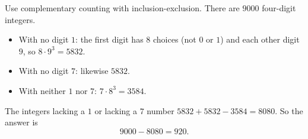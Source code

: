 Use complementary counting with inclusion-exclusion. There are $9000$ four-digit integers.
\begin{itemize}
\item With no digit $1$: the first digit has $8$ choices (not $0$ or $1$) and each other digit $9$, so $8\cdot9^3=5832$.
\item With no digit $7$: likewise $5832$.
\item With neither $1$ nor $7$: $7\cdot8^3=3584$.
\end{itemize}
The integers lacking a $1$ or lacking a $7$ number $5832+5832-3584=8080$. So the answer is
\[
9000-8080=\boxed{920}.
\]
